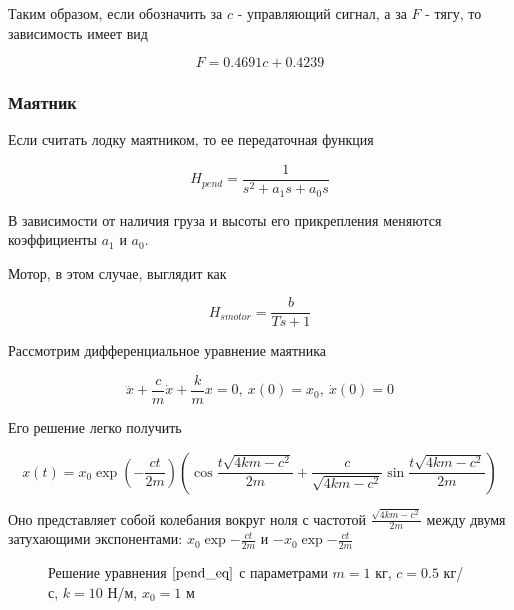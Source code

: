 \documentclass[a4paper]{article}
\begin{document}
Таким образом, если обозначить за $c$ - управляющий сигнал, а за $F$ - тягу, то зависимость имеет вид

$$ F = 0.4691c + 0.4239 $$


\subsubsection{Маятник}

Если считать лодку маятником, то ее передаточная функция

$$ H_{pend} = \frac{1}{s^2 + a_1s + a_0s} $$

В зависимости от наличия груза и высоты его прикрепления меняются коэффициенты $a_1$ и $a_0$.

Мотор, в этом случае, выглядит как

$$ H_{smotor} = \frac{b}{Ts+1} $$

Рассмотрим дифференциальное уравнение маятника

\begin{equation}
	\label{pend_eq}
	\ddot{x} + \frac{c}{m}\dot{x} + \frac{k}{m}x = 0, \ x(0) = x_0, \ \dot{x}(0) = 0 
\end{equation}

Его решение легко получить

$$ x(t) = x_0 \exp\left(-\frac{ct}{2m}\right) \left( \cos\frac{t\sqrt{4km-c^2}}{2m} + \frac{c}{\sqrt{4km-c^2}} \sin\frac{t\sqrt{4km-c^2}}{2m} \right) $$

Оно представляет собой колебания вокруг ноля с частотой $\frac{\sqrt{4km-c^2}}{2m}$ между двумя затухающими экспонентами: $x_0 \exp{-\frac{ct}{2m}}$ и $-x_0 \exp{-\frac{ct}{2m}}$

\begin{figure}[h]
	\caption{Решение уравнения $\ref{pend_eq}$ с параметрами $m = 1$ кг, $c = 0.5$ кг/с, $k = 10$ Н/м, $x_0=1$ м}
\end{figure}
\end{document}

